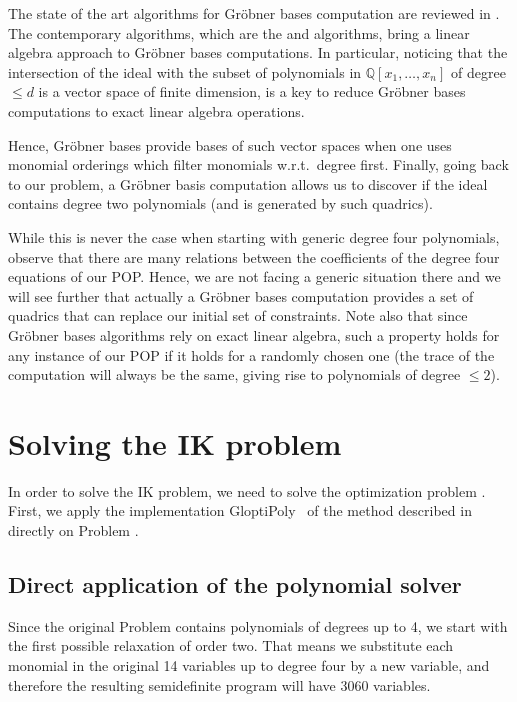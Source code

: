 The state of the art algorithms for Gr\"obner bases computation are reviewed in .
The contemporary algorithms, which are the \FFFF{} and \FFFFF{} algorithms, bring a linear algebra approach to Gr\"obner bases
computations. In particular, noticing that the intersection of the ideal \Ideal{} with the
subset of polynomials in $\mathbb{Q}[x_1, \ldots, x_n]$ of degree $\leq d$ is a
vector space of finite dimension, is a key to reduce Gr\"obner bases
computations to exact linear algebra operations.

Hence, Gr\"obner bases provide bases of such vector spaces when one uses
monomial orderings which filter monomials w.r.t.\ degree first. Finally, going
back to our problem, a Gr\"obner basis computation allows us to discover if the ideal \Ideal{}
contains degree two polynomials (and is generated by such quadrics).

While this is never the case when starting with generic degree four polynomials, observe that
there are many relations between the coefficients of the degree four equations of
our POP.
Hence, we are not facing a generic situation there and we will see
further that actually a Gr\"obner bases computation provides a set of quadrics
that can replace our initial set of constraints.
Note also that since Gr\"obner
bases algorithms rely on exact linear algebra, such a property holds for any
instance of our POP if it holds for a randomly chosen one (the trace of the
computation will always be the same, giving rise to polynomials of degree $\leq
2$).

\section{Solving the IK problem}
In order to solve the IK problem, we need to solve the optimization problem .
First, we apply the implementation GloptiPoly~\cite{gloptipoly} of the method described in  directly on Problem .

\subsection{Direct application of the polynomial solver}
Since the original Problem  contains polynomials of degrees up to 4, we start with the first possible relaxation of order two. That means we substitute each monomial in the original 14 variables up to degree four by a new variable, and therefore the resulting semidefinite program will have \num{3060} variables.


